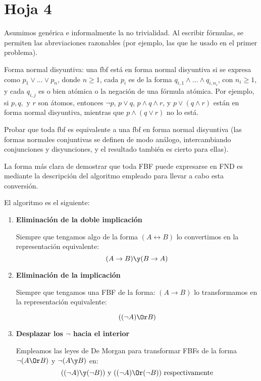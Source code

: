 \section{Hoja 4}

Asumimos gen\'erica e informalmente la no trivialidad. Al escribir f\'ormulas, se permiten
las abreviaciones razonables (por ejemplo, las que he usado en el primer problema).

\begin{problem}[1]
Forma normal disyuntiva: una fbf est\'a en forma normal
disyuntiva si se expresa como $p_1 \vee \dots \vee p_n$,
donde $n\ge1$,  cada $p_i$ es de la forma
$q_{i, 1} \wedge \dots \wedge q_{i,n_i}$, con $n_i\ge1$,
y cada $q_{i, j}$ es o bien at\'omica o la negaci\'on de una f\'ormula at\'omica.
Por ejemplo, si $p, q, $ y $r$ son \'atomos, entonces $\neg p$, $p\vee q$,
$p \wedge q \wedge r$, y  $p \vee (q \wedge r)$ est\'an en forma normal disyuntiva,
mientras que  $p \wedge (q \vee r)$ no lo est\'a.

Probar que toda fbf
es equivalente a una fbf en forma normal disyuntiva (las formas
normales conjuntivas se definen de modo an\'alogo, intercambiando conjunciones
y disyunciones, y el resultado tambi\'en es cierto para ellas).

\solution

La forma más clara de demostrar que toda FBF puede expresarse en FND es mediante la descripción del algoritmo empleado para llevar a cabo esta conversión.

El algoritmo es el siguiente:
\begin{enumerate}
\item \textbf{Eliminación de la doble implicación}

Siempre que tengamos algo de la forma $(A \leftrightarrow B)$ lo convertimos en la representación equivalente:
\[(A \to B) \y (B \to A)\]

\item \textbf{Eliminación de la implicación}

Siempre que tengamos una FBF de la forma: $(A \to B)$ lo transformamos en la representación equivalente:

\[((\neg A) \Or B)\]

\item \textbf{Desplazar los $\neg$ hacia el interior}

Empleamos las leyes de De Morgan para transformar FBFs de la forma $\neg(A \Or B)$ y $\neg(A \y B)$ en:
\[((\neg A) \y (\neg B)) \text{ y } ((\neg A) \Or (\neg B)) \text{ respectivamente}\]


\end{enumerate}
\end{problem}
